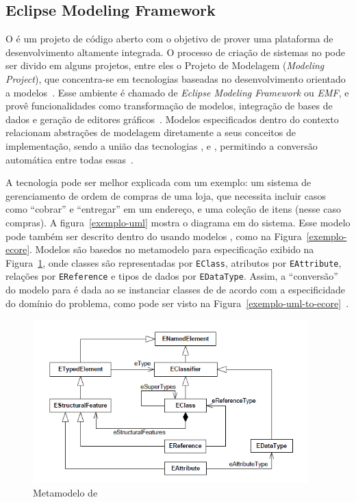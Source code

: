 \subsection{Eclipse Modeling Framework}
O \eclipse é um projeto de código aberto com o objetivo de prover uma plataforma de desenvolvimento altamente integrada. O processo de criação de sistemas no \eclipse pode ser divido em alguns projetos, entre eles o Projeto de Modelagem (\textit{Modeling Project}), que concentra-se em tecnologias baseadas no desenvolvimento orientado a modelos~\cite{steinberg2008emf}. Esse ambiente é chamado de \textit{Eclipse Modeling Framework} ou \textit{EMF}, e provê funcionalidades como transformação de modelos, integração de bases de dados e geração de editores gráficos~\cite{steinberg2008emf}. Modelos especificados dentro do contexto \emf relacionam abstrações de modelagem diretamente a seus conceitos de implementação, sendo a união das tecnologias \uml, \xml e \java, permitindo a conversão automática entre todas essas~\cite{steinberg2008emf}. 

A tecnologia \emf pode ser melhor explicada com um exemplo: um sistema de gerenciamento de ordem de compras de uma loja, que necessita incluir casos como ``cobrar'' e ``entregar'' em um endereço, e uma coleção de itens (nesse caso compras). A figura~\ref{exemplo-uml} mostra o diagrama em \uml do sistema. Esse modelo pode também ser descrito dentro do \emf usando modelos \ecore, como na Figura~\ref{exemplo-ecore}. Modelos \ecore são basedos no metamodelo para especificação exibido na Figura~\ref{metamodelo-ecore}, onde classes são representadas por \texttt{EClass}, atributos por \texttt{EAttribute}, relações por \texttt{EReference} e tipos de dados por \texttt{EDataType}. Assim, a ``conversão'' do modelo \uml para \ecore é dada ao se instanciar classes de \ecore de acordo com a especificidade do domínio do problema, como pode ser visto na Figura~\ref{exemplo-uml-to-ecore}~\cite{steinberg2008emf}. 

\begin{figure}[h]
	\centering
	\includegraphics[width=0.95\textwidth]{figuras/exemplos-emf/metamodelo-ecore.png}
	\caption{Metamodelo de \ecore~\cite{kern2008interchange}}
	\label{metamodelo-ecore}
\end{figure}

